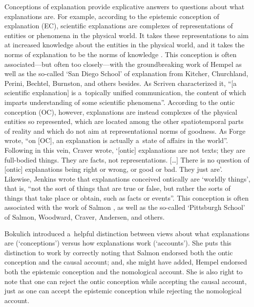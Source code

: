 Conceptions of explanation provide explicative answers to questions about what explanations are. For example, according to the epistemic conception of explanation (EC), scientific explanations are complexes of representations of entities or phenomena in the physical world. It takes these representations to aim at increased knowledge about the entities in the physical world, and it takes the norms of explanation to be the norms of knowledge
\parencite[][p.998]{wright_ontic_2018}. %
 This conception is often associated---but often too closely---with the groundbreaking work of Hempel 
\parencite*[][]{hempel_aspects_1965} %
 as well as the so-called ‘San Diego School' of explanation from Kitcher, Churchland, Perini, Bechtel, Burnston, and others besides. As Scriven 
\parencite*[][p.224]{scriven_explanations_1962} %
 characterized it, ``[a scientific explanation] is a~topically unified communication, the content of which imparts understanding of some scientific phenomena''. According to the ontic conception (OC), however, explanations are instead complexes of the physical entities so represented, which are located among the other spatiotemporal parts of reality and which do not aim at representational norms of goodness. As Forge 
\parencite*[][p.76]{anapolitanos_explanation_1998} %
 wrote, ``on [OC], an explanation is actually a~state of affairs in the world''. Following in this vein, Craver 
\parencite*[][p.27]{craver_explaining_2007} %
 wrote, ‘[ontic] explanations are not texts; they are full-bodied things. They are facts, not representations. […] There is no question of [ontic] explanations being right or wrong, or good or bad. They just are'. Likewise, Jenkins 
\parencite*[][p.64]{jenkins_romeo_2008} %
 wrote that explanations conceived ontically are ‘worldly things', that is, ``not the sort of things that are true or false, but rather the sorts of things that take place or obtain, such as facts or events''. This conception is often associated with the work of Salmon 
\parencite*[][]{salmon_scientific_1984}, %
 as well as the so-called ‘Pittsburgh School' of Salmon, Woodward, Craver, Andersen, and others.

Bokulich
\parencite*[][p.263]{bokulich_fiction_2016} %
 introduced a~helpful distinction between views about what explanations are (‘conceptions') versus how explanations work (‘accounts'). She puts this distinction to work by correctly noting that Salmon endorsed both the ontic conception and the causal account; and, she might have added, Hempel endorsed both the epistemic conception and the nomological account. She is also right to note that one can reject the ontic conception while accepting the causal account, just as one can accept the epistemic conception while rejecting the nomological account.

